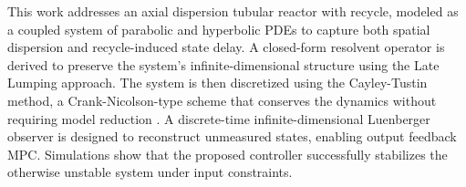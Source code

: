 This work addresses an axial dispersion tubular reactor with recycle, modeled as a coupled system of parabolic and hyperbolic PDEs to capture both spatial dispersion and recycle-induced state delay.
A closed-form resolvent operator is derived to preserve the system’s infinite-dimensional structure using the Late Lumping approach.
The system is then discretized using the Cayley-Tustin method, a Crank-Nicolson-type scheme that conserves the dynamics without requiring model reduction \cite{havu2007cayley, xu2017linear}.
A discrete-time infinite-dimensional Luenberger observer is designed to reconstruct unmeasured states, enabling output feedback MPC.
Simulations show that the proposed controller successfully stabilizes the otherwise unstable system under input constraints.
